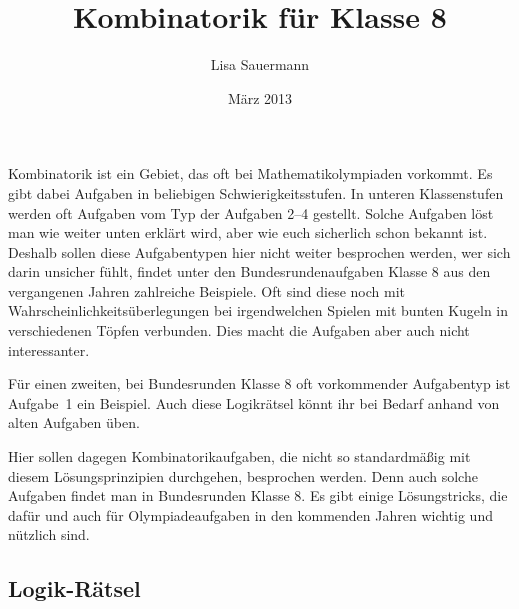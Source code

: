\documentclass[11pt,a4paper]{article}
\title{Kombinatorik für Klasse 8\kosemnetlicensemark}
\author{Lisa Sauermann}
\date{März 2013}
\begin{document}
\maketitle

Kombinatorik ist ein Gebiet, das oft bei Mathematikolympiaden vorkommt. Es
gibt dabei Aufgaben in beliebigen Schwierigkeitsstufen. In unteren
Klassenstufen werden oft Aufgaben vom Typ der Aufgaben 2--4 gestellt. Solche
Aufgaben löst man wie weiter unten erklärt wird, aber wie euch sicherlich
schon bekannt ist. Deshalb sollen diese Aufgabentypen hier nicht weiter
besprochen werden, wer sich darin unsicher fühlt, findet unter den
Bundesrundenaufgaben Klasse 8 aus den vergangenen Jahren zahlreiche
Beispiele. Oft sind diese noch mit Wahrscheinlichkeitsüberlegungen bei
irgendwelchen Spielen mit bunten Kugeln in verschiedenen Töpfen
verbunden. Dies macht die Aufgaben aber auch nicht interessanter.

Für einen zweiten, bei Bundesrunden Klasse 8 oft vorkommender Aufgabentyp ist
Aufgabe~1 ein Beispiel. Auch diese Logikrätsel könnt ihr bei Bedarf anhand von
alten Aufgaben üben.

Hier sollen dagegen Kombinatorikaufgaben, die nicht so standardmäßig mit
diesem Lösungsprinzipien durchgehen, besprochen werden. Denn auch solche
Aufgaben findet man in Bundesrunden Klasse 8. Es gibt einige Lösungstricks,
die dafür und auch für Olympiadeaufgaben in den kommenden Jahren wichtig und
nützlich sind.

\subsection*{Logik-Rätsel}
\end{document}

